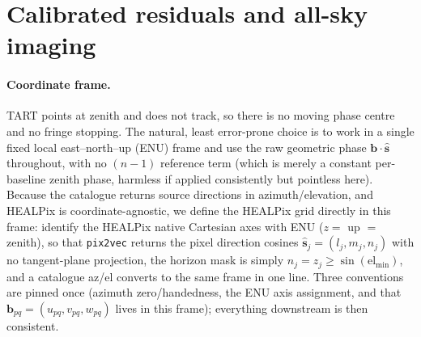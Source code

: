 \documentclass[11pt]{article}
\begin{document}
\section{Calibrated residuals and all-sky imaging}
\label{sec:imaging}

\paragraph{Coordinate frame.} TART points at zenith and does not track, so there is no moving phase
centre and no fringe stopping. The natural, least error-prone choice is to work in a single fixed
local east--north--up (ENU) frame and use the raw geometric phase $\bm{b}\cdot\hat{\bm{s}}$ throughout,
with no $(n-1)$ reference term (which is merely a constant per-baseline zenith phase, harmless if
applied consistently but pointless here). Because the catalogue returns source directions in
azimuth/elevation, and HEALPix is coordinate-agnostic, we define the HEALPix grid directly in this
frame: identify the HEALPix native Cartesian axes with ENU ($z=$ up $=$ zenith), so that
\texttt{pix2vec} returns the pixel direction cosines $\hat{\bm{s}}_j=(l_j,m_j,n_j)$ with no
tangent-plane projection, the horizon mask is simply $n_j=z_j\ge\sin(\mathrm{el}_{\min})$, and a
catalogue az/el converts to the same frame in one line. Three conventions are pinned once (azimuth
zero/handedness, the ENU axis assignment, and that $\bm{b}_{pq}=(u_{pq},v_{pq},w_{pq})$ lives in this
frame); everything downstream is then consistent.
\end{document}
